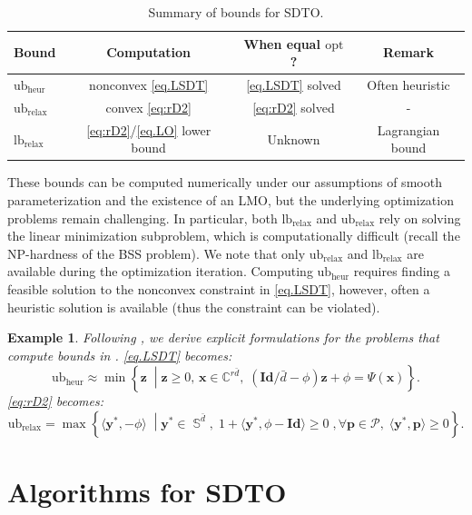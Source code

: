 \documentclass[smallextended]{svjour3}
\newtheorem{example}{Example}
\newcommand{\cP}{\mathcal P}
\newcommand{\C}{\mathbb C}
\newcommand{\1}{\mathbf{1}}
\newcommand{\x}{\mathbf{x}}
\newcommand{\y}{\mathbf{y}}
\newcommand{\p}{\mathbf{p}}
\newcommand{\z}{\mathbf{z}}
\newcommand{\Id}{\mathbf{Id}}
\newcommand{\opt}{\text{opt}}
\newcommand{\heur}{\text{heur}}
\newcommand{\relx}{\text{relax}}
\newcommand{\lb}{\text{lb}}
\newcommand{\ub}{\text{ub}}
\newcommand{\NPh}{\textsf{NP}-hard}
\DeclareMathOperator{\herm}{\mathbb{S}}
\newcommand{\inner}[2]{\langle #1, #2 \rangle}
\begin{document}
\begin{table}[h!]
\centering
\begin{tabular}{l|ccc}
\toprule
Bound &   Computation & When equal $\opt$? & Remark\\
\midrule
$\ub_{\heur}$ & nonconvex \eqref{eq.LSDT} & \eqref{eq.LSDT}  solved & Often heuristic \\
$\ub_{\relx}$  & convex \eqref{eq:rD2} & \eqref{eq:rD2} solved & - \\
$\lb_{\relx}$  & \eqref{eq:rD2}/\eqref{eq.LO} lower bound & Unknown & Lagrangian bound  \\
\bottomrule
\end{tabular}
\caption{Summary of bounds for SDTO.}
\label{tab.bounds}
\end{table}

 These bounds can be computed numerically under our assumptions of smooth parameterization and the existence of an LMO,  but the underlying optimization problems remain challenging. In particular, both $\lb_{\relx}$ and $\ub_{\relx}$ rely on solving the linear minimization subproblem, which is  computationally difficult (recall the \NPh{}ness of the BSS problem). We note that only $\ub_{\relx}$ and $\lb_{\relx}$ are available during the optimization iteration. Computing  $\ub_{\heur}$  requires finding a feasible solution to the nonconvex constraint in \eqref{eq.LSDT}, however, often a heuristic solution is available (thus the constraint can be violated).

\begin{example}
    \label{exp.ref3}
        Following , we derive explicit formulations for the problems that compute bounds in . \eqref{eq.LSDT} becomes:
    \begin{equation}
      \ub_{\heur} \approx  \min \left\{ \z \;\middle|\z \ge 0,\, \x \in \C^{r\bar{d}},\; (\Id / \bar{d} - \phi)\z + \phi = \Psi(\x)\right\}.
    \end{equation}
\eqref{eq:rD2} becomes:
    \begin{equation}
     \ub_{\relx} =   \max \left\{ \inner{\y^*}{-\phi} \;\middle|\y^* \in \herm^{\bar{d}},\; 1 +\inner{\y^*}{\phi - \Id}   \ge 0\;, \forall \p \in \cP,\; \inner{\y^*}{\p} \ge 0  \right\}.
    \end{equation}
\end{example}



\section{Algorithms for SDTO}
\label{sec.algo}
\end{document}
